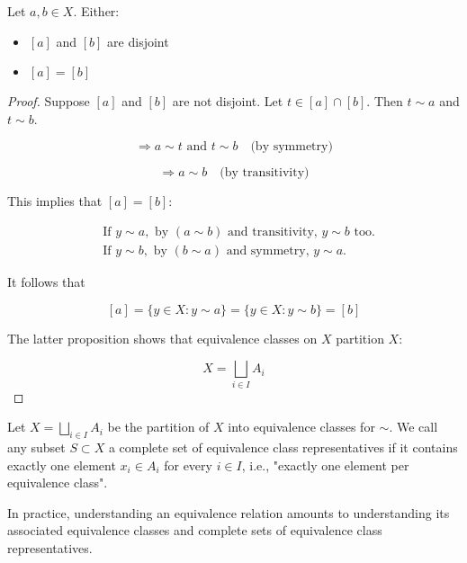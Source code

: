 \documentclass[11pt, draft]{article}
\begin{document}
\begin{proposition}

    Let $a, b \in X$. Either:
    \begin{itemize}
        \item $[a]$ and $[b]$ are disjoint
        \item $[a] = [b]$
    \end{itemize}
\end{proposition}
\begin{proof} Suppose $[a]$ and $[b]$ are not disjoint. Let $t \in [a] \cap [b]$. Then $t \sim a$ and $t \sim b$.

    \[
        \Rightarrow a \sim t \text{ and } t \sim b \quad \text{(by symmetry)}
    \]

    \[
        \Rightarrow a \sim b \quad \text{(by transitivity)}
    \]

    This implies that $[a] = [b]$:

    \[
        \begin{aligned}
             & \text{If } y \sim a, \text{ by } (a \sim b) \text{ and transitivity, } y \sim b \text{ too.} \\
             & \text{If } y \sim b, \text{ by } (b \sim a) \text{ and symmetry, } y \sim a.
        \end{aligned}
    \]

    It follows that

    \[
        [a] = \{ y \in X : y \sim a \} = \{ y \in X : y \sim b \} = [b]
    \]

    The latter proposition shows that equivalence classes on $X$ partition $X$:

    \[
        X = \bigsqcup_{i \in I} A_i
    \]
\end{proof}
\begin{definition} Let $X = \bigsqcup_{i \in I} A_i$ be the partition of $X$ into equivalence classes for $\sim$. We call any subset $S \subset X$ a complete set of equivalence class representatives if it contains exactly one element $x_i \in A_i$ for every $i \in I$, i.e., "exactly one element per equivalence class".
\end{definition}

In practice, understanding an equivalence relation amounts to understanding its
associated equivalence classes and complete sets of equivalence class
representatives.
\end{document}

